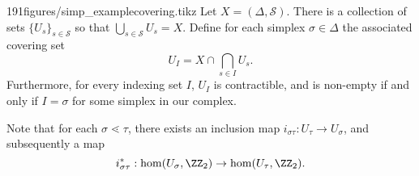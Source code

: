 \begin{claimfigureenv}{191figures/simp_examplecovering.tikz}
	Let $X=(\Delta, \mathcal S)$. There is a collection of sets $\{U_s\}_{s\in \mathcal S}$ so that $\bigcup_{s\in \mathcal S} U_s=X$.
	Define for each simplex $\sigma\in \Delta$ the associated covering set 
	\[U_{I}=X\cap \bigcap_{s\in I}U_s.\]
	Furthermore, for every indexing set $I$,  $U_I$ is contractible, and is non-empty if and only if $I=\sigma$ for some simplex in our complex. 

	Note that for each $\sigma\lessdot\tau$, there exists an inclusion map $i_{\sigma\tau}:U_\tau\to U_\sigma$, and subsequently a map 
	\[i^*_{\sigma\tau}: \hom(U_\sigma, \ZZ_2)\to \hom(U_\tau, \ZZ_2).\]
\end{claimfigureenv}
